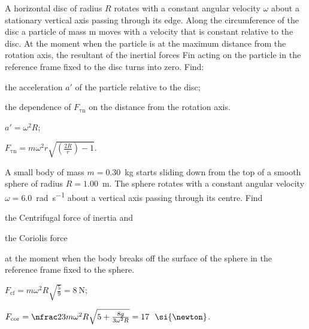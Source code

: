 \begin{problem}
	A horizontal disc of radius $R$ rotates with a constant angular velocity $\omega$ about a stationary vertical axis passing through its edge. Along the circumference of the disc a particle of mass m moves with a velocity that is constant relative to the disc. At the moment when the particle is at the maximum distance from the rotation axis, the resultant of the inertial forces Fin acting on the particle in the reference frame fixed to the disc turns into zero. Find: 
	\begin{enumerate*}[label=(\alph*)]
		\item the acceleration $a'$ of the particle relative to the disc; 
		\item the dependence of $F_{\mathrm{\tau n}}$ on the distance from the rotation axis.
	\end{enumerate*}
	\begin{solution}
		\begin{enumerate*}[label=(\alph*)]
			\item $a' = \omega^2 R$;
			\item $F_{\mathrm{\tau n}} = m\omega^2 r \sqrt{\left( \frac{2R}{r}\right) - 1}$.
		\end{enumerate*}
	\end{solution}
\end{problem}


\begin{problem}
	A small body of mass $m = 0.30$~kg starts sliding down from the top of a smooth sphere of radius $R = 1.00$~m. The sphere rotates with a constant angular velocity $\omega = 6.0$~\si{\radian\per\second} about a vertical axis passing through its centre. Find 
	\begin{enumerate*}[label=(\alph*)]
		\item the Centrifugal force of inertia and
		\item the Coriolis force 
	\end{enumerate*}
	at the moment when the body breaks off the surface of the sphere in the reference frame fixed to the sphere.	 
	\begin{solution}
		\begin{enumerate*}[label=(\alph*)]
			\item $F_{\mathrm{cf}} = m\omega^2 R \sqrt{\frac59} = 8~\si{\newton}$;
			\item $F_{\mathrm{cor}} = \nfrac23 m\omega^2 R \sqrt{5 + \frac{8g}{3\omega^2R}} = 17~~\si{\newton}$.
		\end{enumerate*}
	\end{solution}
\end{problem}




